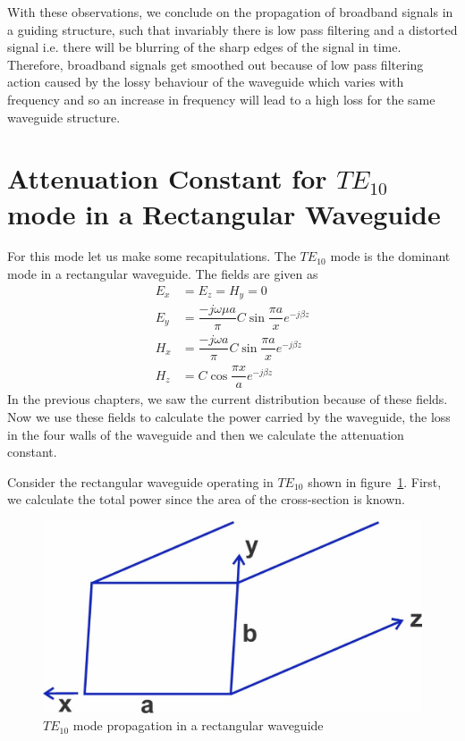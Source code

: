 With these observations, we conclude on the propagation of broadband signals in a guiding structure, such that invariably there is low pass filtering and a distorted signal i.e. there will be blurring of the sharp edges of the signal in time. Therefore, broadband signals get smoothed out because of low pass filtering action caused by the lossy behaviour of the waveguide which varies with frequency and so an increase in frequency will lead to a high loss for the same waveguide structure.

\section{Attenuation Constant for $TE_{10}$ mode in a Rectangular Waveguide}
For this mode let us make some recapitulations. The $TE_{10}$ mode is the dominant mode in a rectangular waveguide. The fields are given as
\begin{align*}
E_{x} &= E_{z} = H_{y} = 0\\
E_{y} &= \dfrac{-j\omega\mu a }{\pi} C\sin \dfrac{\pi a}{x} e ^{-j\beta z}\\
H_{x} &= \dfrac{-j\omega a}{\pi} C \sin\dfrac{\pi a}{x}
e^{-j\beta z}\\
H_{z} &= C\cos \dfrac{\pi x}{a} e^{-j\beta z}
\end{align*}
In the previous chapters, we saw the current distribution because of these fields. Now we use these fields to calculate the power carried by the waveguide, the loss in the four walls of the waveguide and then we calculate the attenuation constant.

Consider the rectangular waveguide operating in $TE_{10}$ shown in figure~\ref{fig:lectureimage21}. First, we calculate the total power since the area of the cross-section is known.
\begin{figure}[H]
\centering
\includegraphics[width=1\linewidth]{./graphics/lecture-image-21.jpg}
\caption{$TE_{10}$ mode propagation in a rectangular waveguide}
\label{fig:lectureimage21}
\end{figure}

